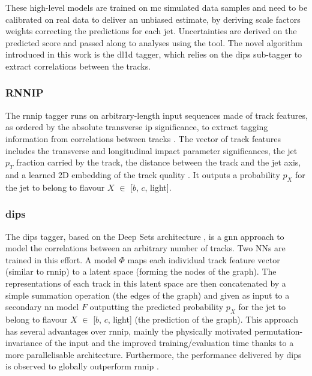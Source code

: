 These high-level models are trained on \gls{mc} simulated data samples and need to be calibrated on real data to deliver an unbiased estimate, by deriving \gls{scale factors} weights correcting the predictions for each jet. Uncertainties are derived on the predicted score and passed along to analyses using the tool. The novel algorithm introduced in this work is the \gls{dl1d} tagger, which relies on the \gls{dips} sub-tagger to extract correlations between the tracks.  

\subsubsection{RNNIP}
The \gls{rnnip} tagger runs on arbitrary-length input sequences made of track features, as ordered by the absolute transverse \gls{ip} significance, to extract tagging information from correlations between tracks \cite{ATL-PHYS-PUB-2017-003}. The vector of track features includes the transverse and longitudinal impact parameter significances, the jet $p_T$ fraction carried by the track, the distance between the track and the jet axis, and a learned 2D embedding of the track quality \cite{Paganini:2289214}. It outputs a probability $p_X$ for the jet to belong to flavour $X$ $\in$ [$b$, $c$, light].

\subsubsection{dips}
The \gls{dips} tagger, based on the Deep Sets architecture \cite{NIPS2017_f22e4747}, is a \gls{gnn} approach to model the correlations between an arbitrary number of tracks. Two NNs are trained in this effort. A model $\Phi$ maps each individual track feature vector (similar to \gls{rnnip}) to a latent space (forming the nodes of the graph). The representations of each track in this latent space are then concatenated by a simple summation operation (the edges of the graph) and given as input to a secondary \gls{nn} model $F$ outputting the predicted probability $p_X$ for the jet to belong to flavour $X$ $\in$ [$b$, $c$, light] (the prediction of the graph). This approach has several advantages over \gls{rnnip}, mainly the physically motivated permutation-invariance of the input and the improved training/evaluation time thanks to a more parallelisable architecture. Furthermore, the performance delivered by \gls{dips} is observed to globally outperform \gls{rnnip} \cite{ATL-PHYS-PUB-2020-014}. 

